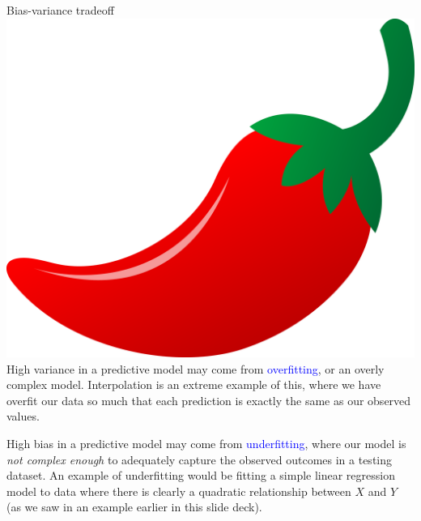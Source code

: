 \documentclass[10pt,t]{beamer}
\begin{document}
\begin{frame}{Bias-variance tradeoff \includegraphics[scale=0.01]{chilipepper.png}}
High variance in a predictive model may come from \textcolor{blue}{overfitting}, or an overly complex model. Interpolation is an extreme example of this, where we have overfit our data so much that each prediction is exactly the same as our observed values.

\vspace{0.3cm}

High bias in a predictive model may come from \textcolor{blue}{underfitting}, where our model is \textit{not complex enough} to adequately capture the observed outcomes in a testing dataset. An example of underfitting would be fitting a simple linear regression model to data where there is clearly a quadratic relationship between $X$ and $Y$ (as we saw in an example earlier in this slide deck).

\end{frame}
\end{document}
